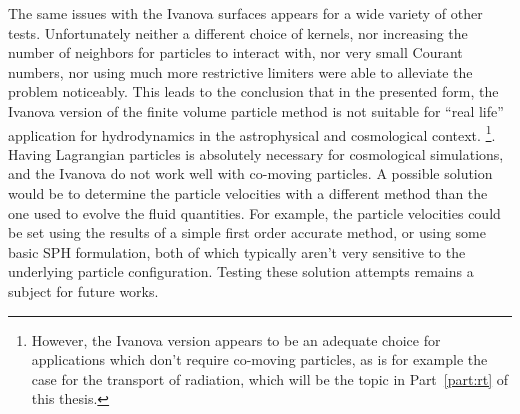 The same issues with the Ivanova surfaces appears for a wide variety of other tests. Unfortunately
neither a different choice of kernels, nor increasing the number of neighbors for particles to
interact with, nor very small Courant numbers, nor using much more restrictive limiters were able to alleviate the problem noticeably. This leads to the conclusion that in the presented form, the
Ivanova version of the finite volume particle method is not suitable for ``real life'' application
for hydrodynamics in the astrophysical and cosmological context. \footnote{
However, the Ivanova version appears to be an adequate choice for applications which don't require
co-moving particles, as is for example the case for the transport of radiation, which will be the
topic in Part~\ref{part:rt} of this thesis.}.
Having Lagrangian particles is absolutely necessary for cosmological simulations, and the Ivanova
\Aij do not work well with co-moving particles. A possible solution would be to determine the
particle velocities with a different method than the one used to evolve the fluid quantities. For
example, the particle velocities could be set using the results of a simple first order accurate
method, or using some basic SPH formulation, both of which typically aren't very sensitive to the
underlying particle configuration. Testing these solution attempts remains a subject for future
works.





